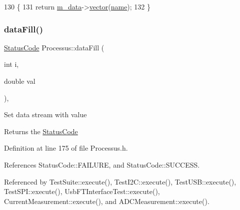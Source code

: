 \begin{DoxyCode}
130                                         \{
131     \textcolor{keywordflow}{return} \hyperlink{classProcessus_a3da9a9de8af54e2f47807a3e09dfccff}{m\_data}->\hyperlink{classData_a94e00cdd58c1d6f11487f1ac47fee4bc}{vector}(\hyperlink{classObject_a300f4c05dd468c7bb8b3c968868443c1}{name});
132   \}
\end{DoxyCode}
\mbox{\label{classProcessus_a0d093b48f3218a088ba030e24372f18c}} 
\subsubsection{\texorpdfstring{data\+Fill()}{dataFill()}\hspace{0.1cm}{\footnotesize\ttfamily [1/2]}}
{\footnotesize\ttfamily \hyperlink{classStatusCode}{Status\+Code} Processus\+::data\+Fill (\begin{DoxyParamCaption}\item[{int}]{i,  }\item[{double}]{val }\end{DoxyParamCaption})\hspace{0.3cm}{\ttfamily [inline]}, {\ttfamily [inherited]}}

Set data stream with value \begin{DoxyReturn}{Returns}
the \hyperlink{classStatusCode}{Status\+Code} 
\end{DoxyReturn}


Definition at line 175 of file Processus.\+h.



References Status\+Code\+::\+F\+A\+I\+L\+U\+RE, and Status\+Code\+::\+S\+U\+C\+C\+E\+SS.



Referenced by Test\+Suite\+::execute(), Test\+I2\+C\+::execute(), Test\+U\+S\+B\+::execute(), Test\+S\+P\+I\+::execute(), Usb\+F\+T\+Interface\+Test\+::execute(), Current\+Measurement\+::execute(), and A\+D\+C\+Measurement\+::execute().


